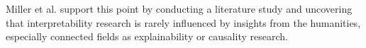 Miller et al. \cite{millerExplainableAIBeware2017} support this point by conducting a literature study and uncovering that interpretability research is rarely influenced by insights from the humanities, especially connected fields as explainability or causality research.


